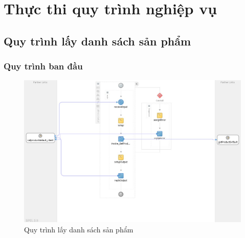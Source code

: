 \section{Thực thi quy trình nghiệp vụ}


\subsection{Quy trình lấy danh sách sản phẩm}

\subsubsection*{Quy trình ban đầu}
\begin{figure}[!htp]
    \centering
    \includegraphics[width=12cm]{img/bpel/productDefault.jpg}
    \newline
    \caption{Quy trình lấy danh sách sản phẩm}
\end{figure}

